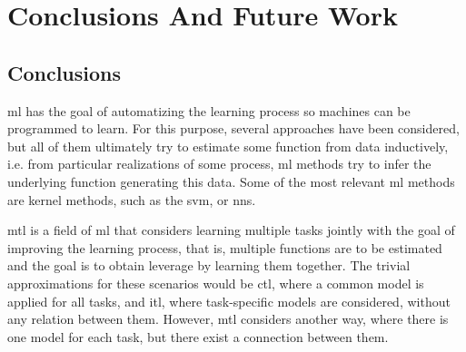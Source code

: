 
\chapter{Conclusions And Future Work} %
\label{ChapterConclusions}

\section{Conclusions}
%
\acrfull{ml} has the goal of automatizing the learning process so machines can be programmed to learn. For this purpose, several approaches have been considered, but all of them ultimately try to estimate some function from data inductively, i.e. from particular realizations of some process, \acrshort{ml} methods try to infer the underlying function generating this data. Some of the most relevant \acrshort{ml} methods are kernel methods, such as the \acrfull{svm}, or \acrfull{nns}.

\acrfull{mtl} is a field of \acrshort{ml} that considers learning multiple tasks jointly with the goal of improving the learning process, that is, multiple functions are to be estimated and the goal is to obtain leverage by learning them together. The trivial approximations for these scenarios would be \acrfull{ctl}, where a common model is applied for all tasks, and \acrfull{itl}, where task-specific models are considered, without any relation between them. However, \acrshort{mtl} considers another way, where there is one model for each task, but there exist a connection between them.

